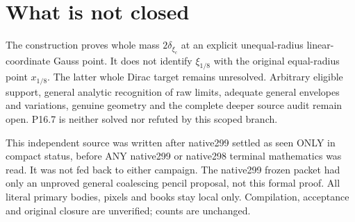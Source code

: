 \documentclass[11pt]{article}
\begin{document}
\section{What is not closed}
The construction proves whole mass $2\delta_{\xi_c}$ at an
explicit unequal-radius linear-coordinate Gauss point. It does not
identify $\xi_{1/8}$ with the original equal-radius point
$x_{1/8}$. The latter whole Dirac target remains unresolved.
Arbitrary eligible support, general analytic recognition of raw
limits, adequate general envelopes and variations, genuine geometry
and the complete deeper source audit remain open. P16.7 is neither
solved nor refuted by this scoped branch.

This independent source was written after native299 settled as
seen ONLY in compact status, before ANY native299 or native298
terminal mathematics was read. It was not fed back to either campaign.
The native299 frozen packet had only an unproved general coalescing
pencil proposal, not this formal proof. All literal primary bodies,
pixels and books stay local only. Compilation, acceptance and
original closure are unverified; counts are unchanged.
\end{document}
